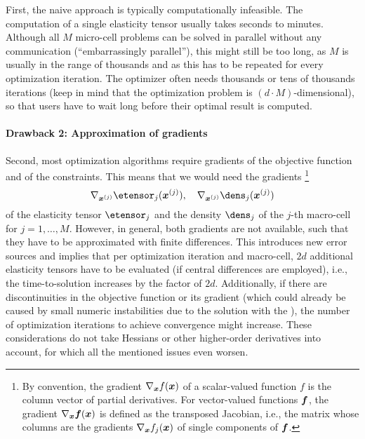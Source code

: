 First, the naive approach is typically computationally infeasible.
The computation of a single elasticity tensor usually takes seconds to
minutes.
Although all $M$ micro-cell problems can be solved in parallel without any
communication (``embarrassingly parallel''), this might still be too long,
as $M$ is usually in the range of thousands and
as this has to be repeated for every optimization iteration.
The optimizer often needs thousands or tens of thousands iterations
(keep in mind that the optimization problem is $(d \cdot M)$-dimensional),
so that users have to wait long before their optimal result is computed.

\paragraph{Drawback 2: Approximation of gradients}

Second, most optimization algorithms require gradients of the
objective function and of the constraints.
This means that we would need the gradients%
\footnote{%
  By convention, the gradient $\nabla_{{\boldsymbol{x}}} f({\boldsymbol{x}})$ of a
  scalar-valued function $f$ is the column vector of partial derivatives.
  For vector-valued functions ${\boldsymbol{f}}$, the gradient $\nabla_{{\boldsymbol{x}}} {\boldsymbol{f}}({\boldsymbol{x}})$
  is defined as the transposed Jacobian, i.e., the matrix whose columns
  are the gradients $\nabla_{{\boldsymbol{x}}} f_j({\boldsymbol{x}})$ of single components of
  ${\boldsymbol{f}}$.%
}
\begin{equation}
  \nabla_{\*x^{(j)}} \etensor_j(\*x^{(j)}),\quad
  \nabla_{\*x^{(j)}} \dens_j(\*x^{(j)})
\end{equation}
of the elasticity tensor $\etensor_j$ and
the density $\dens_j$ of the $j$-th macro-cell for $j = 1, \dotsc, M$.
However, in general, both gradients are not available,
such that they have to be approximated with finite differences.
This introduces new error sources and implies that
per optimization iteration and macro-cell,
$2d$ additional elasticity tensors have to be evaluated
(if central differences are employed), i.e.,
the time-to-solution increases by the factor of $2d$.
Additionally, if there are discontinuities in the objective function
or its gradient (which could already be caused by small numeric instabilities
due to the solution with the \fem),
the number of optimization iterations to achieve convergence might
increase.
These considerations do not take Hessians or other higher-order derivatives
into account, for which all the mentioned issues even worsen.
